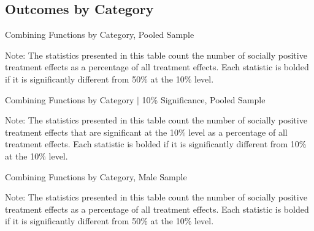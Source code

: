 \subsection{{Outcomes by Category}} \label{appendix:morebycat}


	\begin{sidewaystable}[H]
	\begin{threeparttable}
     \caption{Combining Functions by Category, Pooled Sample}
     \label{table:abccare_rslt_pooled_counts_n50a100_all}
	
		\begin{tablenotes}
	\footnotesize
	\item Note: The statistics presented in this table count the number of socially positive treatment
	 effects as a percentage of all treatment effects. Each statistic is bolded if it is significantly
	 different from 50\% at the 10\% level.
	\end{tablenotes}
	\end{threeparttable}
	\end{sidewaystable}

	\begin{sidewaystable}[H]
	\begin{threeparttable}
     \caption{Combining Functions by Category $|$ 10\% Significance, Pooled Sample}
     \label{table:abccare_rslt_pooled_counts_n10a10_all}
	
	\begin{tablenotes}
	\footnotesize
	\item Note: The statistics presented in this table count the number of socially positive treatment
	effects that are significant at the 10\% level as a percentage of all treatment effects. Each statistic
	is bolded if it is significantly different from 10\% at the 10\% level.
	\end{tablenotes}
	\end{threeparttable}
	\end{sidewaystable}

	\begin{sidewaystable}[H]
	\begin{threeparttable}
     \caption{Combining Functions by Category, Male Sample}
     \label{table:abccare_rslt_male_counts_n50a100_all}
	
		\begin{tablenotes}
	\footnotesize
	\item Note: The statistics presented in this table count the number of socially positive treatment
	 effects as a percentage of all treatment effects. Each statistic is bolded if it is significantly
	 different from 50\% at the 10\% level.
	\end{tablenotes}
	\end{threeparttable}
	\end{sidewaystable}

